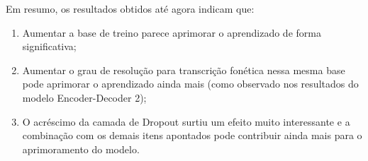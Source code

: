 Em resumo, os resultados obtidos até agora indicam que: 

\begin{enumerate}
\item Aumentar a base de treino parece aprimorar o aprendizado de forma significativa;
\item Aumentar o grau de resolução para transcrição fonética nessa mesma base pode aprimorar o aprendizado ainda mais (como observado nos resultados do modelo Encoder-Decoder 2);
\item O acréscimo da camada de Dropout surtiu um efeito muito interessante e a combinação com os demais itens apontados pode contribuir ainda mais para o aprimoramento do modelo.
\end{enumerate}


